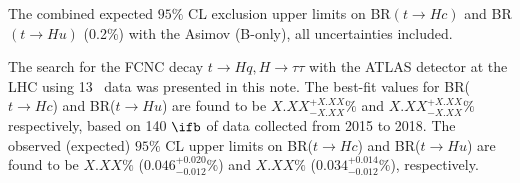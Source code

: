 \begin{table}[htb]
\caption{ The combined expected $95\%$ CL exclusion upper limits on BR$(t\to Hc)$ and BR$(t\to Hu)$ (0.2\%) with the Asimov (B-only), all uncertainties included.}

\label{tab:limit}
\end{table}


The search for the FCNC decay $t\to Hq, H\to\tau\tau$ with the ATLAS detector at the LHC using 13~\TeV{} data was presented in this note. The best-fit values for BR($t\to Hc$) and BR($t\to Hu$) are found to be $X.XX^{+X.XX}_{-X.XX}\%$ and $X.XX^{+X.XX}_{-X.XX}\%$ respectively, based on 140 $\ifb$ of data collected from 2015 to 2018. The observed (expected) $95\%$ CL upper limits on BR($t\to Hc$) and BR($t\to Hu$) are found to be $X.XX\%$ ($0.046^{+0.020}_{-0.012}\%$) and $X.XX\%$ ($0.034^{+0.014}_{-0.012}\%$), respectively.
